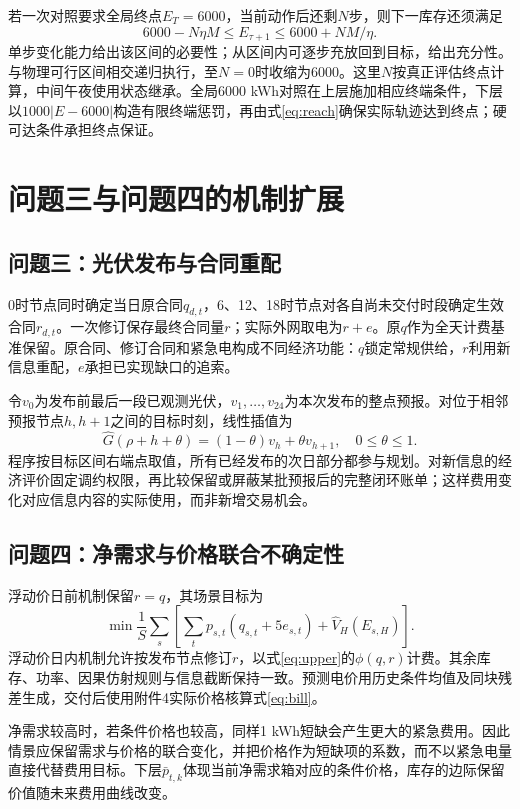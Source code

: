 \documentclass[UTF8,a4paper,zihao=-4,fontset=mac]{ctexart}
\begin{document}
若一次对照要求全局终点$E_T=6000$，当前动作后还剩$N$步，则下一库存还须满足
\begin{equation}
 6000-N\eta M\le E_{\tau+1}\le6000+NM/\eta.\label{eq:reach}
\end{equation}
单步变化能力给出该区间的必要性；从区间内可逐步充放回到目标，给出充分性。与物理可行区间相交递归执行，至$N=0$时收缩为6000。这里$N$按真正评估终点计算，中间午夜使用状态继承。全局6000 kWh对照在上层施加相应终端条件，下层以$1000|E-6000|$构造有限终端惩罚，再由式\eqref{eq:reach}确保实际轨迹达到终点；硬可达条件承担终点保证。

\section{问题三与问题四的机制扩展}
\subsection{问题三：光伏发布与合同重配}
0时节点同时确定当日原合同$q_{d,t}$，6、12、18时节点对各自尚未交付时段确定生效合同$r_{d,t}$。一次修订保存最终合同量$r$；实际外网取电为$r+e$。原$q$作为全天计费基准保留。原合同、修订合同和紧急电构成不同经济功能：$q$锁定常规供给，$r$利用新信息重配，$e$承担已实现缺口的追索。

令$v_0$为发布前最后一段已观测光伏，$v_1,\ldots,v_{24}$为本次发布的整点预报。对位于相邻预报节点$h,h+1$之间的目标时刻，线性插值为
\begin{equation}
\widehat G(\rho+h+\theta)=(1-\theta)v_h+\theta v_{h+1},\quad 0\le\theta\le1.
\end{equation}
程序按目标区间右端点取值，所有已经发布的次日部分都参与规划。对新信息的经济评价固定调约权限，再比较保留或屏蔽某批预报后的完整闭环账单；这样费用变化对应信息内容的实际使用，而非新增交易机会。

\subsection{问题四：净需求与价格联合不确定性}
浮动价日前机制保留$r=q$，其场景目标为
\begin{equation}
\min\frac1S\sum_s\left[\sum_t p_{s,t}(q_{s,t}+5e_{s,t})+\widehat V_H(E_{s,H})\right].
\end{equation}
浮动价日内机制允许按发布节点修订$r$，以式\eqref{eq:upper}的$\phi(q,r)$计费。其余库存、功率、因果仿射规则与信息截断保持一致。预测电价用历史条件均值及同块残差生成，交付后使用附件4实际价格核算式\eqref{eq:bill}。

净需求较高时，若条件价格也较高，同样1 kWh短缺会产生更大的紧急费用。因此情景应保留需求与价格的联合变化，并把价格作为短缺项的系数，而不以紧急电量直接代替费用目标。下层$\bar p_{t,k}$体现当前净需求箱对应的条件价格，库存的边际保留价值随未来费用曲线改变。
\end{document}
